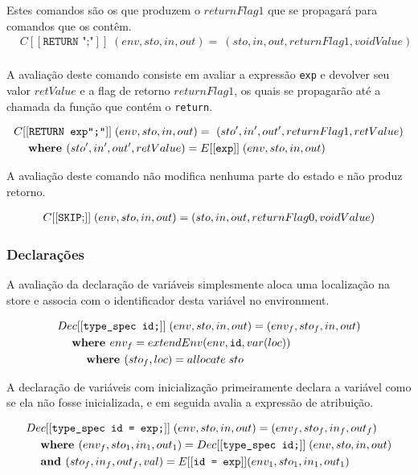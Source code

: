 \documentclass[12pt]{article}
\newcommand\eb[1]{[[\texttt{#1}]]}
\begin{document}
Estes comandos são os que produzem o $returnFlag1$ que se propagará para comandos que os contêm.
\begin{align*}
&C\eb{RETURN ";"}\; (env,sto,in,out) =  \ (sto,in,out,returnFlag1,voidValue) \\
\end{align*}

A avaliação deste comando consiste em  avaliar a expressão {\tt exp} e devolver seu valor $retValue$ e a flag de retorno $returnFlag1$, os quais se propagarão até a chamada da função que contém o {\tt return}.

\begin{align*}
&C\eb{RETURN exp";"}\; (env,sto,in,out) =  \ (sto',in',out',returnFlag1,retValue) \\
&\hspace{3ex}\textbf{where } (sto',in',out',retValue) = E\eb{exp}\; (env,sto,in,out) \\
\end{align*}

A avaliação deste comando não modifica nenhuma parte do estado e não produz retorno.

\begin{align*}
&C[[{\tt SKIP;}]]\; (env,sto,in,out) = (sto,in,out,returnFlag0,voidValue) \\
\end{align*}


\subsubsection{Declarações}

A avaliação da declaração de variáveis simplesmente aloca uma localização na store e associa com o identificador desta variável no environment.

\begin{align*}
&Dec\eb{type\_spec id;}\;(env,sto,in,out) = (env_f,sto_f,in,out)\\
&\hspace{3ex}\textbf{where } env_f = extendEnv(env,\texttt{id}, var(loc))\\
&\hspace{6ex}\textbf{where } (sto_f,loc) = allocate\; sto
\end{align*}

A declaração de variáveis com inicialização primeiramente declara a variável como se ela não fosse inicializada, e em seguida avalia a expressão de atribuição.

\begin{align*}
&Dec\eb{type\_spec id = exp;}\;(env,sto,in,out) = (env_f,sto_f,in_f,out_f)\\
&\hspace{3ex}\textbf{where }(env_f,sto_1,in_1,out_1) = Dec\eb{type\_spec id;}\;(env,sto,in,out) \\
&\hspace{3ex}\textbf{and }(sto_f,in_f,out_f,val) = E\eb{id = exp} (env_1,sto_1,in_1,out_1)
\end{align*}
\end{document}
